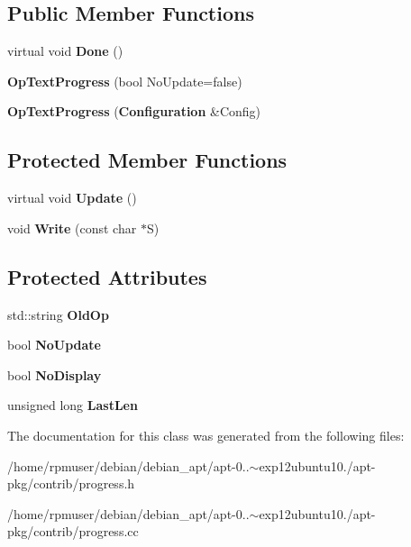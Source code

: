\subsection*{\-Public \-Member \-Functions}
\begin{DoxyCompactItemize}
\item 
virtual void {\bfseries \-Done} ()\label{classOpTextProgress_a44cace8d4257cdedded8faa819aa0fcb}

\item 
{\bfseries \-Op\-Text\-Progress} (bool \-No\-Update=false)\label{classOpTextProgress_a79c0c10d9e6e4ecf431db6c8beae7a46}

\item 
{\bfseries \-Op\-Text\-Progress} ({\bf \-Configuration} \&\-Config)\label{classOpTextProgress_a97f4896b1b2bdc8b64b1a9f192ff20c9}

\end{DoxyCompactItemize}
\subsection*{\-Protected \-Member \-Functions}
\begin{DoxyCompactItemize}
\item 
virtual void {\bfseries \-Update} ()\label{classOpTextProgress_aec0783b5a136e042adcc47bae4fe5291}

\item 
void {\bfseries \-Write} (const char $\ast$\-S)\label{classOpTextProgress_a6f2161ad493d6f0e27a9ab22281e0e84}

\end{DoxyCompactItemize}
\subsection*{\-Protected \-Attributes}
\begin{DoxyCompactItemize}
\item 
std\-::string {\bfseries \-Old\-Op}\label{classOpTextProgress_a7111653b0fa5a57f10864fa0908cccf3}

\item 
bool {\bfseries \-No\-Update}\label{classOpTextProgress_a5d41b6202f7970e1a5a82fa4b471230d}

\item 
bool {\bfseries \-No\-Display}\label{classOpTextProgress_a79831aaac2cf10c2e9141f8a01a6d88a}

\item 
unsigned long {\bfseries \-Last\-Len}\label{classOpTextProgress_abf86a8712d3d8c8bcdfbc725fdf5ede9}

\end{DoxyCompactItemize}


\-The documentation for this class was generated from the following files\-:\begin{DoxyCompactItemize}
\item 
/home/rpmuser/debian/debian\-\_\-apt/apt-\/0..$\sim$exp12ubuntu10./apt-\/pkg/contrib/progress.\-h\item 
/home/rpmuser/debian/debian\-\_\-apt/apt-\/0..$\sim$exp12ubuntu10./apt-\/pkg/contrib/progress.\-cc\end{DoxyCompactItemize}
